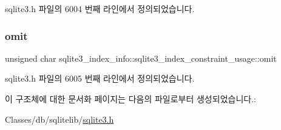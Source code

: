sqlite3.\+h 파일의 6004 번째 라인에서 정의되었습니다.

\mbox{\label{structsqlite3__index__info_1_1sqlite3__index__constraint__usage_ad07fa17d30e4fb3abe23ceaf84edf0ef}} 
\subsubsection{\texorpdfstring{omit}{omit}}
{\footnotesize\ttfamily unsigned char sqlite3\+\_\+index\+\_\+info\+::sqlite3\+\_\+index\+\_\+constraint\+\_\+usage\+::omit}



sqlite3.\+h 파일의 6005 번째 라인에서 정의되었습니다.



이 구조체에 대한 문서화 페이지는 다음의 파일로부터 생성되었습니다.\+:\begin{DoxyCompactItemize}
\item 
Classes/db/sqlitelib/\hyperlink{sqlite3_8h}{sqlite3.\+h}\end{DoxyCompactItemize}
